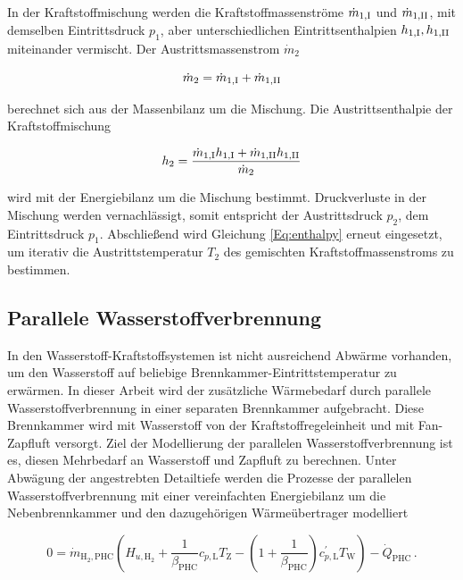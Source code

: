 In der Kraftstoffmischung werden die Kraftstoffmassenströme $\dot{m}_{1,\mathrm{\rom{1}}}$ und $\dot{m}_{1,\mathrm{\rom{2}}}$, mit demselben Eintrittsdruck $p_1$, aber unterschiedlichen Eintrittsenthalpien $h_{1,\mathrm{\rom{1}}}, h_{1,\mathrm{\rom{2}}}$ miteinander vermischt. Der Austrittsmassenstrom $\dot{m}_2$

\begin{equation}\label{Eq:mass}
	\dot{m}_2 = \dot{m}_{1,\mathrm{\rom{1}}}+\dot{m}_{1,\mathrm{\rom{2}}}
\end{equation}

berechnet sich aus der Massenbilanz um die Mischung. Die Austrittsenthalpie der Kraftstoffmischung 

\begin{equation}\label{Eq:energy-mix}
	h_{2} = \frac{\dot{m}_{1,\mathrm{\rom{1}}}h_{1,\mathrm{\rom{1}}}+\dot{m}_{1,\mathrm{\rom{2}}}h_{1,\mathrm{\rom{2}}}}{\dot{m}_2}
\end{equation}

wird mit der Energiebilanz um die Mischung bestimmt. Druckverluste in der Mischung werden vernachlässigt, somit entspricht der Austrittsdruck $p_2$, dem Eintrittsdruck $p_1$. Abschließend wird Gleichung \ref{Eq:enthalpy} erneut eingesetzt, um iterativ die Austrittstemperatur $T_2$ des gemischten Kraftstoffmassenstroms zu bestimmen. 

\subsection{Parallele Wasserstoffverbrennung}

In den Wasserstoff-Kraftstoffsystemen ist nicht ausreichend Abwärme vorhanden, um den Wasserstoff auf beliebige Brennkammer-Eintrittstemperatur zu erwärmen. In dieser Arbeit wird der zusätzliche Wärmebedarf durch parallele Wasserstoffverbrennung in einer separaten Brennkammer aufgebracht. Diese Brennkammer wird mit Wasserstoff von der Kraftstoffregeleinheit und mit Fan-Zapfluft versorgt. Ziel der Modellierung der parallelen Wasserstoffverbrennung ist es, diesen Mehrbedarf an Wasserstoff und Zapfluft zu berechnen. Unter Abwägung der angestrebten Detailtiefe werden die Prozesse der parallelen Wasserstoffverbrennung mit einer vereinfachten Energiebilanz um die Nebenbrennkammer und den dazugehörigen Wärmeübertrager modelliert 


\begin{equation}\label{Eq:phc}
	0 = \dot{m}_{\mathrm{H}_2, \mathrm{PHC}}\left(H_{u, \mathrm{H}_2} + \frac{1}{\beta_\mathrm{PHC}}c_{p,\mathrm{L}} T_\mathrm{Z} - \left(1+\frac{1}{\beta_\mathrm{PHC}}\right)c_{p,\mathrm{L}}^{'} T_\mathrm{W}\right)-\dot{Q}_\mathrm{PHC}\,.
\end{equation}

